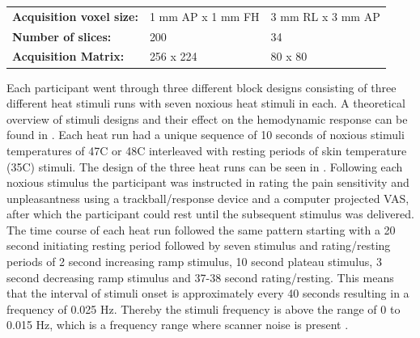 \begin{table}[H]
\begin{tabular}{lll}
	\textbf{Acquisition voxel size:} & 1 mm AP x 1 mm FH                                                             & 3 mm RL x 3 mm AP                                                             \\
	\textbf{Number of slices:}       & 200                                                                           & 34                                                                            \\
	\textbf{Acquisition Matrix:}     & 256 x 224                                                                     & 80 x 80                                                                       \\ \hline
\end{tabular}
\end{table}
 
Each participant went through three different block designs consisting of three different heat stimuli runs with seven noxious heat stimuli in each. A theoretical overview of stimuli designs and their effect on the hemodynamic response can be found in . Each heat run had a unique sequence of 10 seconds of noxious stimuli temperatures of 47\degree C or 48\degree C interleaved with resting periods of skin temperature (35\degree C) stimuli. The design of the three heat runs can be seen in . 
Following each noxious stimulus the participant was instructed in rating the pain sensitivity and unpleasantness using a trackball/response device and a computer projected VAS, after which the participant could rest until the subsequent stimulus was delivered. The time course of each heat run followed the same pattern starting with a 20 second initiating resting period followed by seven stimulus and rating/resting periods of 2 second increasing ramp stimulus, 10 second plateau stimulus, 3 second decreasing ramp stimulus and 37-38 second rating/resting. This means that the interval of stimuli onset is approximately every 40 seconds resulting in a frequency of 0.025 Hz. Thereby the stimuli frequency is above the range of 0 to 0.015 Hz, which is a frequency range where scanner noise is present \cite{Poldrack2011}.


